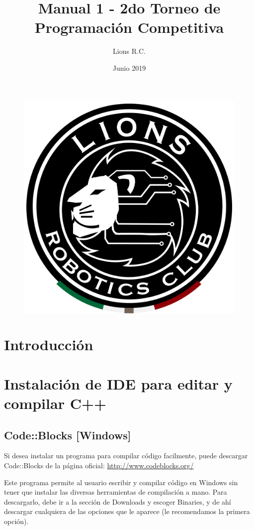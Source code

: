 \documentclass{article}
\title{Manual 1 - 2do Torneo de Programación Competitiva}
\author{Lions R.C.}
\date{Junio 2019}
\begin{document}
\maketitle

\begin{figure}[H]
    \centering
    \includegraphics[width=0.2\paperwidth]{newblack}
\end{figure}

\section{Introducción}

\section{Instalación de IDE para editar y compilar C++}

\subsection{Code::Blocks [Windows]}
Si desea instalar un programa para compilar código facilmente, puede descargar Code::Blocks de la página oficial: \url{http://www.codeblocks.org/}

Este programa permite al usuario escribir y compilar código en Windows sin tener que instalar las diversas herramientas de compilación a mano. Para descargarlo, debe ir a la sección de Downloads y escoger Binaries, y de ahí descargar cualquiera de las opciones que le aparece (le recomendamos la primera opción).
\end{document}
